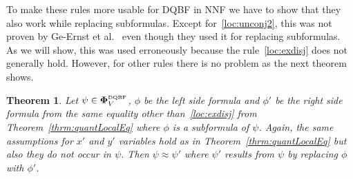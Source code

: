 \documentclass[
  digital, %
  twoside, %
  table,   %
  nolof,     %
  nolot,     %
]{fithesis3}
\newtheorem{theorem}{Theorem}[chapter] %
\theoremstyle{definition}
\theoremstyle{remark}
\newcommand{\DQBF}[1]{\mathbf{\Phi}_{#1}^{\normalfont{\text{\tiny DQBF}}}}
\begin{document}
To make these rules more usable for DQBF in NNF we have to show that they also work while replacing subformulas. Except for~\eqref{loc:unconj2}, this was not proven by Ge-Ernst et al.~\cite{HQSquantifierLocalization} even though they used it for replacing subformulas. As we will show, this was used erroneously because the rule~\eqref{loc:exdisj} does not generally hold. However, for other rules there is no problem as the next theorem shows. %

\begin{theorem}
  \label{thrm:quantLocalSubformulas}
  Let $\psi \in \DQBF{V}$, $\phi$ be the left side formula and $\phi'$ be the right side formula  from the same equality other than~\eqref{loc:exdisj} from Theorem~\ref{thrm:quantLocalEq} where $\phi$ is a subformula of $\psi$. Again, the same assumptions for $x'$ and $y'$ variables hold as in Theorem~\ref{thrm:quantLocalEq} but also they do not occur in $\psi$. Then $\psi \approx \psi'$ where $\psi'$ results from $\psi$ by replacing $\phi$ with $\phi'$.
\end{theorem}
\end{document}
